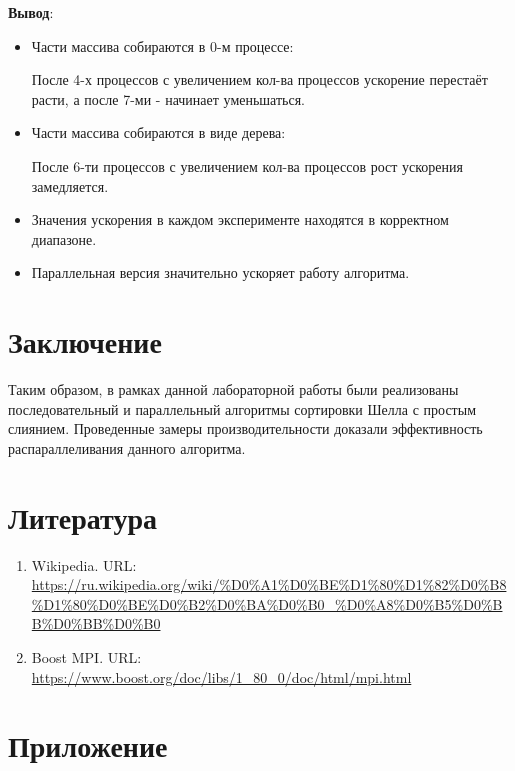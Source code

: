 \documentclass{report}
\begin{document}
\textbf{Вывод}: 
    \begin{itemize}
        \item Части массива собираются в 0-м процессе: 
        \par После 4-х процессов с увеличением кол-ва процессов ускорение перестаёт расти, а после 7-ми - начинает уменьшаться.
        \item Части массива собираются в виде дерева:
        \par После 6-ти процессов с увеличением кол-ва процессов рост ускорения замедляется.
        \item Значения ускорения в каждом эксперименте находятся в корректном диапазоне.
        \item Параллельная версия значительно ускоряет работу алгоритма.
    \end{itemize}

\newpage

\section*{Заключение}
Таким образом, в рамках данной лабораторной работы были реализованы последовательный и параллельный алгоритмы сортировки Шелла с простым слиянием. Проведенные замеры производительности доказали эффективность распараллеливания данного алгоритма.
\newpage

\section*{Литература}
\begin{enumerate}
\item Wikipedia. URL: \newline \url{https://ru.wikipedia.org/wiki/%D0%A1%D0%BE%D1%80%D1%82%D0%B8%D1%80%D0%BE%D0%B2%D0%BA%D0%B0_%D0%A8%D0%B5%D0%BB%D0%BB%D0%B0}
\item Boost MPI. URL: \newline \url{https://www.boost.org/doc/libs/1_80_0/doc/html/mpi.html}
\end{enumerate}


\newpage

\section*{Приложение}
\end{document}
